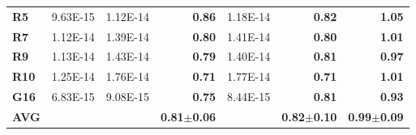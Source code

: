 \documentclass[encoding=utf8,british]{tumphthesis}
\begin{document}
\begin{table}[H]
\begin{subtable}{1.0\textwidth}
{\begin{tabular}{|l|llr|lr|r|}
\rowcolor[HTML]{CFE2F3} 
\textbf{R5}                               & 9.63E-15                                             & 1.12E-14                                              & \textbf{0.86}                                    & 1.18E-14                                                       & \textbf{0.82}                                    & \textbf{1.05}                                            \\
\textbf{R7}                               & 1.12E-14                                             & 1.39E-14                                              & \textbf{0.80}                                    & 1.41E-14                                                       & \textbf{0.80}                                    & \textbf{1.01}                                            \\
\rowcolor[HTML]{CFE2F3} 
\textbf{R9}                               & 1.13E-14                                             & 1.43E-14                                              & \textbf{0.79}                                    & 1.40E-14                                                       & \textbf{0.81}                                    & \textbf{0.97}                                            \\
\textbf{R10}                              & 1.25E-14                                             & 1.76E-14                                              & \textbf{0.71}                                    & 1.77E-14                                                       & \textbf{0.71}                                    & \textbf{1.01}                                            \\
\rowcolor[HTML]{CFE2F3} 
\textbf{G16}                              & 6.83E-15                                             & 9.08E-15                                              & \textbf{0.75}                                    & 8.44E-15                                                       & \textbf{0.81}                                    & \textbf{0.93}                                            \\ \hline
\textbf{AVG}                             &                                                      &                                                       & \textbf{0.81$\pm$0.06}                           &                                                                & \textbf{0.82$\pm$0.10}                           & \textbf{0.99$\pm$0.09}                                  
 \\ \hline
\end{tabular}}
    \end{subtable}


\end{table}
\end{document}
